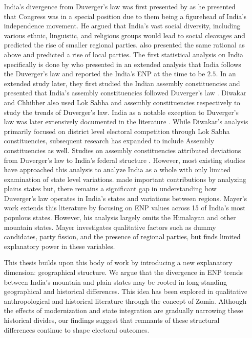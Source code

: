 \begin{sloppypar}
 India's divergence from Duverger's law was first presented by \cite{lijphart1994} as he presented that Congress was in a special position due to them being a figurehead of India's independence movement. He argued that India's vast social diversity, including various ethnic, linguistic, and religious groups would lead to social cleavages and predicted the rise of smaller regional parties. \cite{taagepera1989seats,sridharan1997duverger} also presented the same rational as above and predicted a rise of local parties. The first statistical analysis on India specifically is done by \cite{chhibber1998party} who presented in an extended analysis that India follows the Duverger's law and reported the India's ENP at the time to be $2.5$. In an extended study later, they first studied the Indian assembly constituencies and presented that India's assembly constituencies followed Duverger's law \citep{chhibber2009formation}. Diwakar and Chhibber also used Lok Sabha and assembly constituencies respectively to study the trends of Duverger’s law. 
India as a notable exception to Duverger's law was later extensively documented in the literature \citep{diwakar2007duverger, diwakar2010party, mayer2013gross,carneggie_duverger}. While Diwakar's analysis primarily focused on district level electoral competition through Lok Sabha constituencies, subsequent research has expanded to include Assembly constituencies as well. Studies on assembly constituencies attributed deviations from Duverger's law to India's federal structure \citep{chhibber2006duvergerian}. However, most existing studies have approached this analysis to analyze India as a whole with only limited examination of state level variations. \cite{mayer2013gross} made important contributions by analyzing plains states but, there remains a significant gap in understanding how Duverger's law operates in India's states and variations between regions.   Mayer’s work extends this literature by focusing on ENP values across 15 of India’s most populous states. However, his analysis largely omits the Himalayan and other mountain states. Mayer  investigates qualitative factors such as dummy candidates, party fission, and the presence of regional parties, but finds limited explanatory power in these variables. 

This thesis builds upon this body of work by introducing a new explanatory dimension: geographical structure. We argue that the divergence in ENP trends between India’s mountain and plain states may be rooted in long-standing geographical and historical differences. This  idea has been explored in qualitative anthropological and historical literature through the concept of Zomia. Although the effects of modernization and state integration are gradually narrowing these historical divides, our findings suggest that remnants of these structural differences continue to shape electoral outcomes.



\end{sloppypar}
